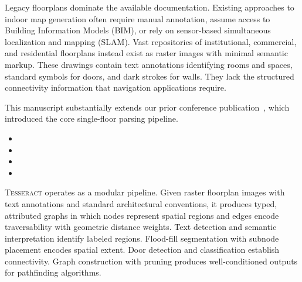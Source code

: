 \documentclass[manuscript,screen,review]{acmart}
\newcommand{\tesseract}{\textsc{Tesseract}}
\begin{document}
Legacy floorplans dominate the available documentation. Existing approaches to indoor map generation often require manual annotation, assume access to Building Information Models (BIM), or rely on sensor-based simultaneous localization and mapping (SLAM). Vast repositories of institutional, commercial, and residential floorplans instead exist as raster images with minimal semantic markup. These drawings contain text annotations identifying rooms and spaces, standard symbols for doors, and dark strokes for walls. They lack the structured connectivity information that navigation applications require.

This manuscript substantially extends our prior conference publication~\cite{tesseract_conference}, which introduced the core single-floor parsing pipeline. 
\begin{itemize}
    \item {}
    \item {}
    \item {}
    \item {}
\end{itemize}

\tesseract{} operates as a modular pipeline. Given raster floorplan images with text annotations and standard architectural conventions, it produces typed, attributed graphs in which nodes represent spatial regions and edges encode traversability with geometric distance weights. Text detection and semantic interpretation identify labeled regions. Flood-fill segmentation with subnode placement encodes spatial extent. Door detection and classification establish connectivity. Graph construction with pruning produces well-conditioned outputs for pathfinding algorithms.
\end{document}
